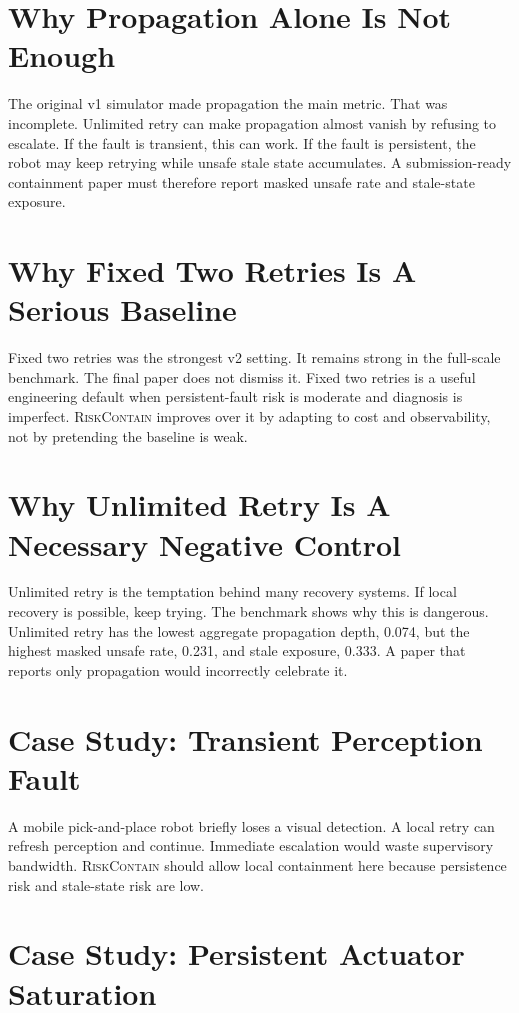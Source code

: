 \documentclass{article}
\newcommand{\method}{\textsc{RiskContain}\xspace}
\begin{document}
\section{Why Propagation Alone Is Not Enough}

The original v1 simulator made propagation the main metric. That was incomplete. Unlimited retry can make propagation almost vanish by refusing to escalate. If the fault is transient, this can work. If the fault is persistent, the robot may keep retrying while unsafe stale state accumulates. A submission-ready containment paper must therefore report masked unsafe rate and stale-state exposure.

\section{Why Fixed Two Retries Is A Serious Baseline}

Fixed two retries was the strongest v2 setting. It remains strong in the full-scale benchmark. The final paper does not dismiss it. Fixed two retries is a useful engineering default when persistent-fault risk is moderate and diagnosis is imperfect. \method improves over it by adapting to cost and observability, not by pretending the baseline is weak.

\section{Why Unlimited Retry Is A Necessary Negative Control}

Unlimited retry is the temptation behind many recovery systems. If local recovery is possible, keep trying. The benchmark shows why this is dangerous. Unlimited retry has the lowest aggregate propagation depth, 0.074, but the highest masked unsafe rate, 0.231, and stale exposure, 0.333. A paper that reports only propagation would incorrectly celebrate it.

\section{Case Study: Transient Perception Fault}

A mobile pick-and-place robot briefly loses a visual detection. A local retry can refresh perception and continue. Immediate escalation would waste supervisory bandwidth. \method should allow local containment here because persistence risk and stale-state risk are low.

\section{Case Study: Persistent Actuator Saturation}
\end{document}
